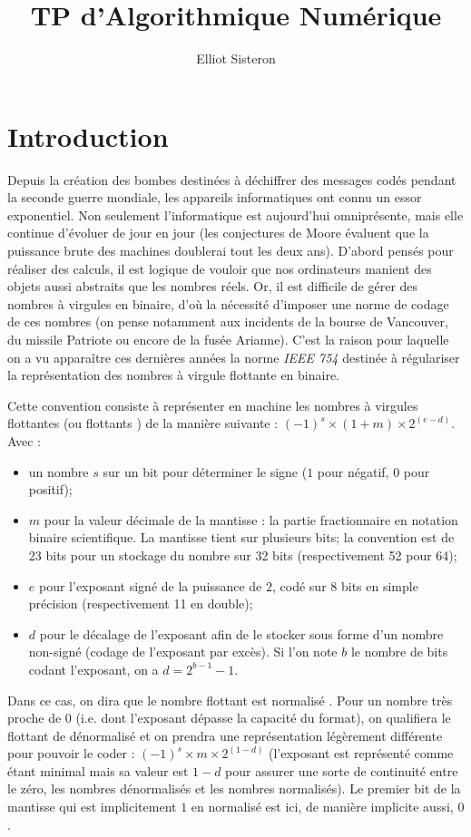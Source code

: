 \documentclass[a4paper, titlepage]{livret} %
\title{TP d'Algorithmique Numérique} %
\author{Elliot Sisteron} %
\begin{document}

	
	\chapter*{Introduction}
		Depuis la création des \og bombes \fg{} destinées à déchiffrer des messages codés pendant la seconde guerre mondiale, les appareils informatiques ont connu un essor exponentiel.
		Non seulement l'informatique est aujourd'hui omniprésente, mais elle continue d'évoluer de jour en jour (les conjectures de Moore évaluent que la puissance brute des machines doublerai tout les deux ans).
		D'abord pensés pour réaliser des calculs, il est logique de vouloir que nos ordinateurs manient des objets aussi abstraits que les nombres réels.
		Or, il est difficile de gérer des nombres à virgules en binaire, d'où la nécessité d'imposer une norme de codage de ces nombres (on pense notamment aux incidents de la bourse de Vancouver, du missile Patriote ou encore de la fusée Arianne).
		C'est la raison pour laquelle on a vu apparaître ces dernières années la norme \emph{IEEE 754} destinée à régulariser la représentation des nombres à virgule flottante en binaire.

		Cette convention consiste à représenter en machine les nombres à virgules flottantes (ou \og flottants \fg) de la manière suivante : $(-1)^s \times (1+m) \times 2^{(e - d)}$.\\
		Avec :
		\begin{itemize}
			\item un nombre $s$ sur un bit pour déterminer le signe ($1$ pour négatif, $0$ pour positif);
			\item $m$ pour la valeur décimale de la \og mantisse \fg{} : la partie fractionnaire en notation binaire scientifique. La mantisse tient sur plusieurs bits; la convention est de 23 bits pour un stockage du nombre sur 32 bits (respectivement 52 pour 64);
			\item $e$ pour l'exposant signé de la puissance de $2$, codé sur 8 bits en simple précision (respectivement 11 en double);
			\item $d$ pour le décalage de l'exposant afin de le stocker sous forme d'un nombre non-signé (codage de l'exposant par excès). Si l'on note $b$ le nombre de bits codant l'exposant, on a $d = 2^{b-1}-1$.
		\end{itemize}
		Dans ce cas, on dira que le nombre flottant est \og normalisé \fg{}.
		Pour un nombre très proche de $0$ (i.e. dont l'exposant dépasse la capacité du format), on qualifiera le flottant de \og dénormalisé \fg{} et on prendra une représentation légèrement différente pour pouvoir le coder : $(-1)^s \times m \times 2^{(1 -d)}$ (l'exposant est représenté comme étant minimal mais sa valeur est $1 - d$ pour assurer une sorte de continuité entre le zéro, les nombres dénormalisés et les nombres normalisés). Le premier bit de la mantisse qui est implicitement $1$ en normalisé est ici, de manière implicite aussi, $0$.
\end{document}
